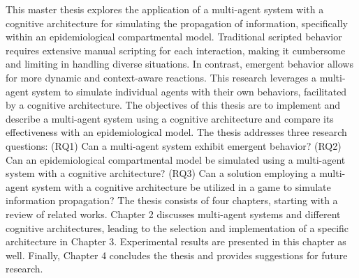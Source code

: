 This master thesis explores the application of a multi-agent system with a cognitive architecture for simulating the propagation of information, specifically within an epidemiological compartmental model. Traditional scripted behavior requires extensive manual scripting for each interaction, making it cumbersome and limiting in handling diverse situations. In contrast, emergent behavior allows for more dynamic and context-aware reactions. This research leverages a multi-agent system to simulate individual agents with their own behaviors, facilitated by a cognitive architecture. The objectives of this thesis are to implement and describe a multi-agent system using a cognitive architecture and compare its effectiveness with an epidemiological model. The thesis addresses three research questions: (RQ1) Can a multi-agent system exhibit emergent behavior? (RQ2) Can an epidemiological compartmental model be simulated using a multi-agent system with a cognitive architecture? (RQ3) Can a solution employing a multi-agent system with a cognitive architecture be utilized in a game to simulate information propagation? The thesis consists of four chapters, starting with a review of related works. Chapter 2 discusses multi-agent systems and different cognitive architectures, leading to the selection and implementation of a specific architecture in Chapter 3. Experimental results are presented in this chapter as well. Finally, Chapter 4 concludes the thesis and provides suggestions for future research.